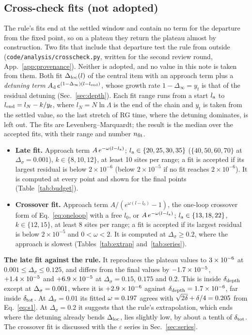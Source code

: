 \documentclass[10pt,a4paper]{article}
\newcommand{\Ds}{\Delta_\sigma}
\newcommand{\Dloc}{\Delta_{\rm loc}}
\newcommand{\code}[1]{\texttt{#1}}
\newcommand{\dd}{\delta_{\rm depth}}
\newcommand{\dtot}{\delta_{\rm tot}}
\begin{document}
\subsection{Cross-check fits (not adopted)}\label{sec:crosscheck}
The rule's fits end at the settled window and contain no term for the departure from the fixed point, so on a plateau they return the
plateau almost by construction. Two fits that include that departure test the rule from outside (\code{code/analysis/crosscheck.py},
written for the second review round, App.~\ref{app:provenance}). Neither is adopted, and no value in this note is taken from them. Both
fit $\Dloc(l)$ of the central item with an approach term plus a \emph{detuning term} $A_{\rm d}\,e^{(1-\Delta_\infty)(l-l_{\rm end})}$,
whose growth rate $1-\Delta_\infty=y_t$ is that of the residual detuning (Sec.~\ref{sec:depth}). Each fit range runs from a start
$l_{\rm a}$ to $l_{\rm end}=l_N-k/y_t$, where $l_N=N\ln\Lambda$ is the end of the chain and $y_t$ is taken from the settled value, so the
last stretch of RG time, where the detuning dominates, is left out. The fits are Levenberg--Marquardt; the result is the median over the
accepted fits, with their range and number $n_{\rm fit}$.
\begin{itemize}
\item \textbf{Late fit.} Approach term $A\,e^{-\omega(l-l_{\rm a})}$; $l_{\rm a}\in\{20,25,30,35\}$ ($\{40,50,60,70\}$ at
  $\Ds=0.001$), $k\in\{8,10,12\}$, at least 10 sites per range; a fit is accepted if its largest residual is below $2\times10^{-6}$
  (below $2\times10^{-5}$ if no fit reaches $2\times10^{-6}$). It is computed at every point and shown for the final points
  (Table~\ref{tab:budget}).
\item \textbf{Crossover fit.} Approach term $A/(e^{\omega(l-l_0)}-1)$, the one-loop crossover form of Eq.~\eqref{eq:oneloop} with a
  free $l_0$, or $A\,e^{-\omega(l-l_{\rm a})}$; $l_{\rm a}\in\{13,18,22\}$, $k\in\{12,15\}$, at least 8 sites per range; a fit is
  accepted if its largest residual is below $2\times10^{-5}$ and $0<\omega<2$. It is computed at $\Ds\ge0.2$, where the approach is
  slowest (Tables~\ref{tab:extrap} and~\ref{tab:series}).
\end{itemize}
\textbf{The late fit against the rule.} It reproduces the plateau values to $3\times10^{-6}$ at $0.001\le\Ds\le0.125$, and differs from
the final values by $-1.7\times10^{-5}$, $+1.4\times10^{-5}$ and $+6.9\times10^{-5}$ at $\Ds=0.15$, $0.175$ and $0.2$. This is
inside $\dd$ except at $\Ds=\nrglateOutside$, where it is $+2.9\times10^{-6}$ against $\dd=\nrgdepthOne$, far inside $\dtot$. At $\Ds=0.01$
its fitted $\omega=0.197$ agrees with $\sqrt{2\delta}+\delta/4=0.205$ from Eq.~\eqref{eq:s1}. At $\Ds=0.2$ it suggests
that the rule's extrapolation, which ends where the detuning already bends $\Dloc$, lies slightly low, by about a tenth of $\dtot$.
The crossover fit is discussed with the $\varepsilon$ series in Sec.~\ref{sec:series}.
\end{document}
